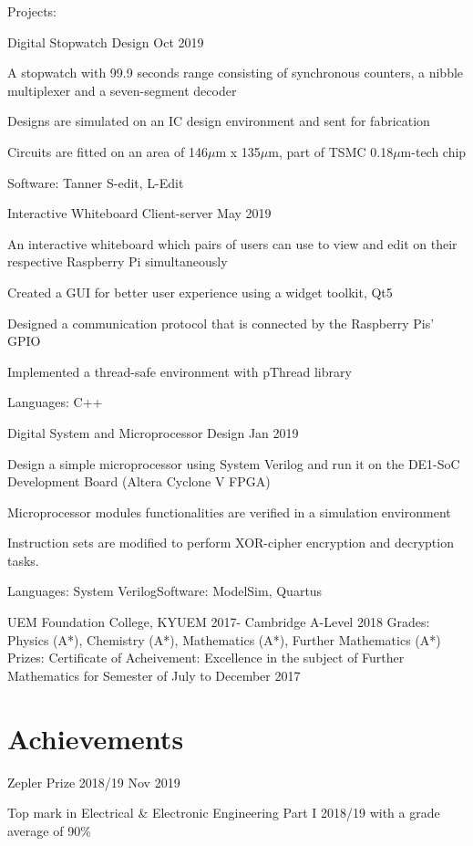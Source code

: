 \documentclass{myresume2}
\begin{document}
\twocolumnEntry
  {Projects:}
  {%
  \projectEntry
    {Digital Stopwatch Design}
    {Oct 2019}
    {\item A stopwatch with 99.9 seconds range consisting of synchronous counters, a nibble multiplexer and a seven-segment decoder
    \item Designs are simulated on an IC design environment and sent for fabrication
    \item Circuits are fitted on an area of 146$\mu$m x 135$\mu$m, part of TSMC 0.18$\mu$m-tech chip}
    {Software: Tanner S-edit, L-Edit}

  \projectEntry
    {Interactive Whiteboard Client-server}
    {May 2019}
    {\item An interactive whiteboard which pairs of users can use to view and edit on their respective Raspberry Pi simultaneously
    \item Created a GUI for better user experience using a widget toolkit, Qt5
    \item Designed a communication protocol that is connected by the Raspberry Pis' GPIO
    \item Implemented a thread-safe environment with pThread library}
    {Languages: C++}

  \projectEntry
    {Digital System and Microprocessor Design}
    {Jan 2019}
    {\item Design a simple microprocessor using System Verilog and run it on the DE1-SoC Development Board (Altera Cyclone V FPGA)
    \item Microprocessor modules functionalities are verified in a simulation environment
    \item Instruction sets are modified to perform XOR-cipher encryption and decryption tasks.}
    {Languages: System Verilog\bigs Software: ModelSim, Quartus}
  }

\headEntry
  {UEM Foundation College, KYUEM}
  {2017-}
  {Cambridge A-Level}
  {2018}
\twocolumnEntry
  {Grades:}
  {Physics (A*), Chemistry (A*), Mathematics (A*), Further Mathematics (A*)}
\twocolumnEntry
  {Prizes:}
  {Certificate of Acheivement: Excellence in the subject of Further Mathematics for Semester of July to December 2017}
\pagebreak
%
%
%
%
\section{Achievements}
\simpleEntry
  {Zepler Prize 2018/19}
  {Nov 2019}
  {\item Top mark in Electrical \& Electronic Engineering Part I 2018/19 with a grade average of 90\%}
\end{document}
